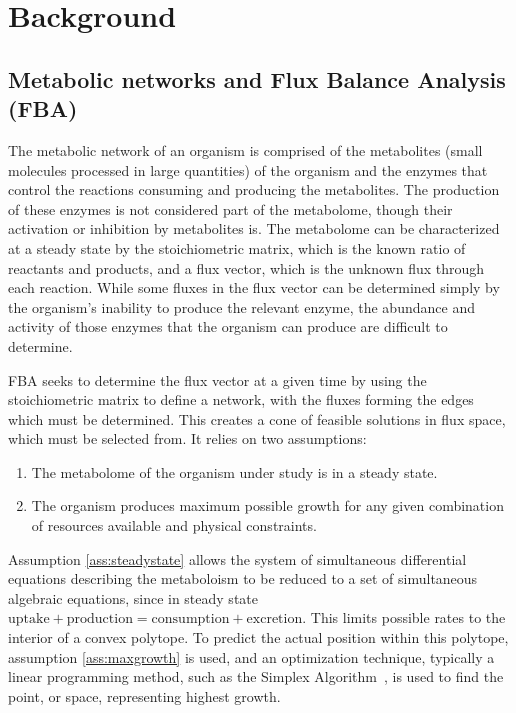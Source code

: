 \chapter{Background}
\section{Metabolic networks and Flux Balance Analysis (FBA)}
The metabolic network of an organism is comprised of the metabolites (small molecules processed in large quantities) of the organism and the enzymes that control the reactions consuming and producing the metabolites. 
The production of these enzymes is not considered part of the metabolome, though their activation or inhibition by metabolites is. 
The metabolome can be characterized at a steady state by the stoichiometric matrix, which is the known ratio of reactants and products, and a flux vector, which is the unknown flux through each reaction. 
While some fluxes in the flux vector can be determined simply by the organism's inability to produce the relevant enzyme, the abundance and activity of those enzymes that the organism can produce are difficult to determine. 

FBA seeks to determine the flux vector at a given time by using the stoichiometric matrix to define a network, with the fluxes forming the edges which must be determined. 
This creates a cone of feasible solutions in flux space, which must be selected from. 
It relies on two assumptions:
\begin{enumerate}
\item \label{ass:steadystate} The metabolome of the organism under study is in a steady state.
\item \label{ass:maxgrowth} The organism produces maximum possible growth for any given combination of resources available and physical constraints.
\end{enumerate}
Assumption \ref{ass:steadystate} allows the system of simultaneous differential equations describing the metaboloism to be reduced to a set of simultaneous algebraic equations, since in steady state \(\text{uptake} + \text{production} = \text{consumption} + \text{excretion}\). 
This limits possible rates to the interior of a convex polytope. 
To predict the actual position within this polytope, assumption \ref{ass:maxgrowth} is used, and an optimization technique, typically a linear programming method, such as the Simplex Algorithm~\cite{Dantzig1951}, is used to find the point, or space, representing highest growth.

